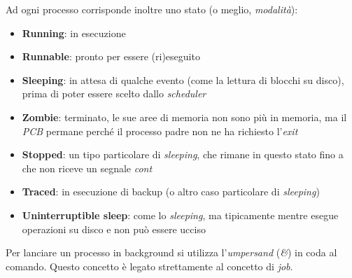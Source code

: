 Ad ogni processo corrisponde inoltre uno stato (o meglio, \textit{modalità}):
\begin{itemize}
    \item \textbf{Running}: in esecuzione
    \item \textbf{Runnable}: pronto per essere (ri)eseguito
    \item \textbf{Sleeping}: in attesa di qualche evento (come la lettura di blocchi su disco), prima di poter essere scelto dallo \textit{scheduler}
    \item \textbf{Zombie}: terminato, le sue aree di memoria non sono più in memoria, ma il \textit{PCB} permane perché il processo padre non ne ha richiesto l'\textit{exit}
    \item \textbf{Stopped}: un tipo particolare di \textit{sleeping}, che rimane in questo stato fino a che non riceve un segnale \textit{cont}
    \item \textbf{Traced}: in esecuzione di backup (o altro caso particolare di \textit{sleeping})
    \item \textbf{Uninterruptible sleep}: come lo \textit{sleeping}, ma tipicamente mentre esegue operazioni su disco e non può essere ucciso
\end{itemize}

Per lanciare un processo in background si utilizza l'\textit{umpersand} (\textit{\&}) in coda al comando.
Questo concetto è legato strettamente al concetto di \textit{job}.

